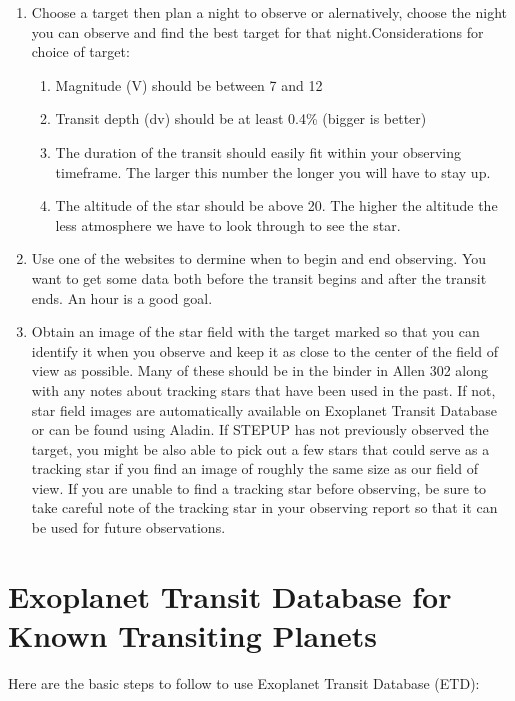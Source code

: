 \documentclass[12pt, preprint]{article}
\begin{document}
\begin{enumerate}
\item Choose a target then plan a night to observe or alernatively, choose the night you can observe and find the best target for that night.Considerations for choice of target:

\begin{enumerate}
\item Magnitude (V) should be between 7 and 12
\item Transit depth (dv) should be at least 0.4\% (bigger is better)
\item The duration of the transit should easily fit within your observing timeframe. The larger this number the longer you will have to stay up.
\item The altitude of the star should be above 20\textdegree. The higher the altitude the less atmosphere we have to look through to see the star.
\end{enumerate}

\item Use one of the websites to dermine when to begin and end observing.  You want to get some data both before the transit begins and after the transit ends. An hour is a good goal.

\item Obtain an image of the star field with the target marked so that you can identify it when you observe and keep it as close to the center of the field of view as possible. Many of these should be in the binder in Allen 302 along with any notes about tracking stars that have been used in the past.  If not, star field images are automatically available on Exoplanet Transit Database or can be found using Aladin. If STEPUP has not previously observed the target, you might be also able to pick out a few stars that could serve as a tracking star if you find an image of roughly the same size as our field of view.  If you are unable to find a tracking star before observing, be sure to take careful note of the tracking star in your observing report so that it can be used for future observations.
\end{enumerate}

\section{Exoplanet Transit Database for Known Transiting Planets}

Here are the basic steps to follow to use Exoplanet Transit Database (ETD):
\end{document}
